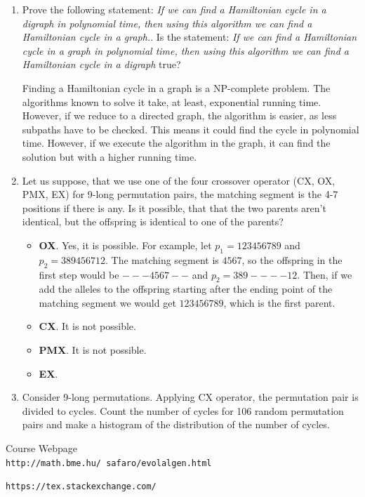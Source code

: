 \documentclass[12pt,english]{article}
\newenvironment{statement}{\fontfamily{ptm}\selectfont}{\par}
\begin{document}
\begin{enumerate}

	\item
		\begin{statement}
		Prove the following statement: \emph{If we can find a Hamiltonian cycle in a digraph in polynomial time, then using this algorithm we can find a Hamiltonian cycle in a graph.}.
		Is the statement: \emph{If we can find a Hamiltonian cycle in a graph in polynomial time, then using this algorithm we can find a Hamiltonian cycle in a digraph} true?
		\end{statement}

		Finding a Hamiltonian cycle in a graph is a NP-complete problem. The algorithms known to solve it take, at least, exponential running time. However, if we reduce to a directed graph, the algorithm is easier, as less subpaths have to be checked. This means it could find the cycle in polynomial time. However, if we execute the algorithm in the graph, it can find the solution but with a higher running time.


	\item
		\begin{statement}
		Let us suppose, that we use one of the four crossover operator (CX, OX, PMX, EX) for 9-long permutation pairs, the matching segment is the 4-7 positions if there is any. Is it possible, that that the two parents aren’t identical, but the offspring is identical to one of the parents?
		\end{statement}

		\begin{itemize}
			\item \textbf{OX}. Yes, it is possible. For example, let $p_1=123456789$ and $p_2=389456712$. The matching segment is $4567$, so the offspring in the first step would be $---4567--$ and $p_2=389----12$. Then, if we add the alleles to the offspring starting after the ending point of the matching segment we would get $123456789$, which is the first parent.
			\item \textbf{CX}. It is not possible.
			\item \textbf{PMX}. It is not possible.
			\item \textbf{EX}.
		\end{itemize}

	\item
		\begin{statement}
		Consider 9-long permutations. Applying CX operator, the permutation pair is divided to cycles. Count the number of cycles for 106 random permutation pairs and make a histogram of the distribution of the number of cycles.
		\end{statement}



\end{enumerate}


\begin{thebibliography}{9}

Course Webpage
\\\texttt{http://math.bme.hu/~safaro/evolalgen.html}


\texttt{https://tex.stackexchange.com/}


\end{thebibliography}
\end{document}
